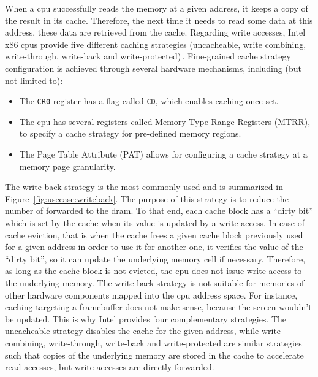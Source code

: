 When a \ac{cpu} successfully reads the memory at a given address, it keeps a
copy of the result in its cache.
%
Therefore, the next time it needs to read some data at this address, these data
are retrieved from the cache.
%
Regarding write accesses, Intel x86 \acp{cpu} provide five different caching
strategies (uncacheable, write combining, write-through, write-back and
write-protected)\,\cite[Volume 3, Chapter~11]{intel2014manual}.
%
Fine-grained cache strategy configuration is achieved through several hardware
mechanisms, including (but not limited to):
%
\begin{itemize}
\item The \texttt{CR0} register has a flag called \texttt{CD}, which enables
  caching once set.
%
\item The \ac{cpu} has several registers called Memory Type Range Registers
  (MTRR), to specify a cache strategy for pre-defined memory regions.
%
\item The Page Table Attribute (PAT) allows for configuring a cache strategy at
  a memory page granularity.
\end{itemize}
%
The write-back strategy is the most commonly used and is summarized in
Figure~\ref{fig:usecase:writeback}.
%
The purpose of this strategy is to reduce the number of \IO forwarded to the
\ac{dram}.
%
To that end, each cache block  has a ``dirty bit'' which is set by the cache when its value is
updated by a write access.
%
In case of cache eviction, that is when the cache frees a given cache block
previously used for a given address in order to use it for another one, it
verifies the value of the ``dirty bit'', so it can update the underlying memory
cell if necessary.
%
Therefore, as long as the cache block is not evicted, the \ac{cpu} does not
issue write access to the underlying memory.
%
The write-back strategy is not suitable for memories of other hardware
components mapped into the \ac{cpu} address space.
%
For instance, caching \IOs targeting a framebuffer does not make sense, because
the screen wouldn't be updated.
%
This is why Intel provides four complementary strategies.
%
The uncacheable strategy disables the cache for the given address, while write
combining, write-through, write-back and write-protected are similar strategies
such that copies of the underlying memory are stored in the cache to accelerate
read accesses, but write accesses are directly forwarded.

